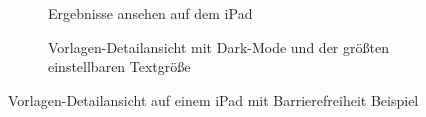 \documentclass[notables, nomenclature, oneside, 150]{HSMW-Thesis}
\begin{document}
	\begin{figure}[ht]
	    \centering
		\begin{subfigure}[t]{\textwidth}
			\centering
		    \caption{Ergebnisse ansehen auf dem iPad}
		    \label{fig:pad1}
		\end{subfigure}
       	\begin{subfigure}[t]{\textwidth}
       		\centering
		    \caption{Vorlagen-Detailansicht mit Dark-Mode und der größten einstellbaren Textgröße}
		    \label{fig:pad2}
		\end{subfigure}
    	\caption{Vorlagen-Detailansicht auf einem iPad mit Barrierefreiheit Beispiel}
		\label{fig:zusatz1}
	\end{figure}
	
\end{document}
